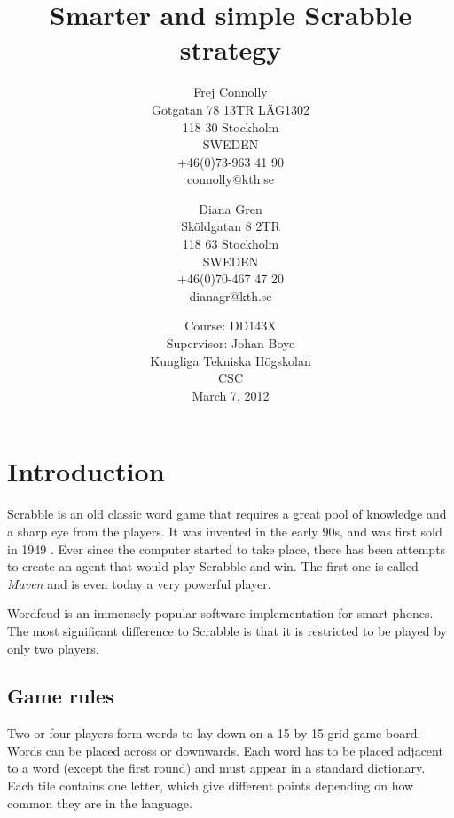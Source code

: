 \documentclass[a4paper, 12pt]{report}
\begin{document}
\title{Smarter and simple Scrabble strategy}
\date{Course: DD143X \\ Supervisor: Johan Boye \\ Kungliga Tekniska Högskolan \\ CSC \\ March 7, 2012}
\author{Frej Connolly \\ Götgatan 78 13TR LÄG1302 \\ 118 30 Stockholm \\ SWEDEN \\ +46(0)73-963 41 90 \\ connolly@kth.se \\
        \and Diana Gren \\ Sköldgatan 8 2TR \\ 118 63 Stockholm \\ SWEDEN \\ +46(0)70-467 47 20 \\ dianagr@kth.se}

\maketitle
\tableofcontents


\chapter{Introduction}
Scrabble is an old classic word game that requires a great pool of knowledge and a sharp eye from the players. It was invented in the early 90s, and was first sold in 1949 \cite{scrabbleforbund}. Ever since the computer started to take place, there has been attempts to create an agent that would play Scrabble and win. The first one is called \emph{Maven} and is even today a very powerful player.

Wordfeud is an immensely popular software implementation for smart phones. The most significant difference to Scrabble is that it is restricted to be played by only two players.

\section{Game rules}
Two or four players form words to lay down on a 15 by 15 grid game board. Words can be placed across or downwards. Each word has to be placed adjacent to a word (except the first round) and must appear in a standard dictionary. Each tile contains one letter, which give different points depending on how common they are in the language.  
\end{document}
